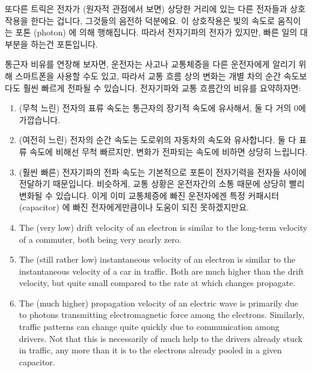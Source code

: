 {	또다른 트릭은 전자가 (원자적 관점에서 보면) 상당한 거리에 있는 다른
	전자들과 상호작용을 한다는 겁니다, 그것들의 음전하 덕분에요.
	이 상호작용은 빛의 속도로 움직이는 포톤 (photon) 에 의해 행해집니다.
	따라서 전자기파의 전자가 있지만, 빠른 일의 대부분을 하는건 포톤입니다.

	통근자 비유를 연장해 보자면, 운전자는 사고나 교통체증을 다른 운전자에게
	알리기 위해 스마트폰을 사용할 수도 있고, 따라서 교통 흐름 상의 변화는
	개별 차의 순간 속도보다도 훨씬 빠르게 전파될 수 있습니다.
	전자기파와 교통 흐름간의 비유를 요약하자면:

	\iffalse

	The other trick is that electrons interact with each other at
	significant distances (from an atomic perspective, anyway),
	courtesy of their negative charge.
	This interaction is carried out by photons, which \emph{do}
	move at the speed of light.
	So even with electricity's electrons, it is photons
	doing most of the fast footwork.

	Extending the commuter analogy, a driver might use a smartphone
	to inform other drivers of an accident or congestion, thus
	allowing a change in traffic flow to propagate much faster
	than the instantaneous velocity of the individual cars.
	Summarizing the analogy between electricity and traffic flow:

	\fi

	\begin{enumerate}
	\item	(무척 느린) 전자의 표류 속도는 통근자의 장기적 속도에 유사해서,
		둘 다 거의 0에 가깝습니다.
	\item	(여전히 느린) 전자의 순간 속도는 도로위의 자동차의 속도와
		유사합니다.
		둘 다 표류 속도에 비해선 무척 빠르지만, 변화가 전파되는 속도에
		비하면 상당히 느립니다.
	\item	(훨씬 빠른) 전자기파의 전파 속도는 기본적으로 포톤이 전자기력을
		전자들 사이에 전달하기 때문입니다.
		비슷하게, 교통 상황은 운전자간의 소통 때문에 상당히 빨리 변화될
		수 있습니다.
		이게 이미 교통체증에 빠진 운전자에겐 특정 커패시터 (capacitor)
		에 빠진 전자에게만큼이나 도움이 되진 못하겠지만요.

	\iffalse

	\item	The (very low) drift velocity of an electron is similar
		to the long-term velocity of a commuter, both being
		very nearly zero.
	\item	The (still rather low) instantaneous velocity of
		an electron is similar to the instantaneous velocity
		of a car in traffic.
		Both are much higher than the drift velocity, but
		quite small compared to the rate at which changes
		propagate.
	\item	The (much higher) propagation velocity of an electric
		wave is primarily due to photons transmitting
		electromagnetic force among the electrons.
		Similarly, traffic patterns can change quite quickly
		due to communication among drivers.
		Not that this is necessarily of much help to the
		drivers already stuck in traffic, any more than it
		is to the electrons already pooled in a given capacitor.


\end{enumerate}}
